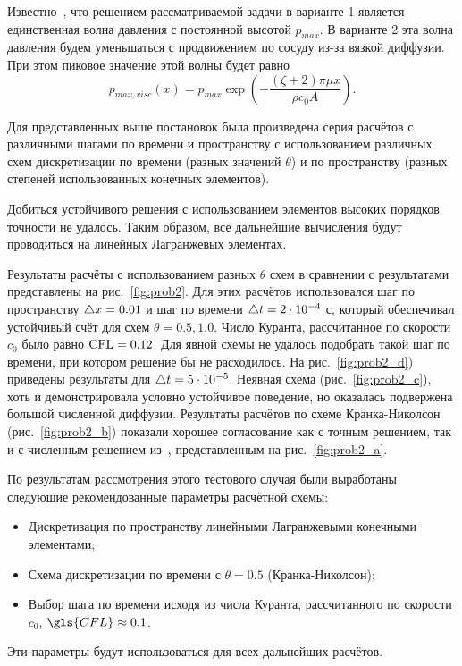 Известно~\cite{boileau:2015}, что решением рассматриваемой задачи
в варианте 1 является единственная волна давления с постоянной высотой $p_{max}$.
В варианте 2 эта волна давления будем уменьшаться с продвижением по сосуду из-за вязкой диффузии. При
этом пиковое значение этой волны будет равно
\begin{equation}
\label{eq:p_peak_visc}
p_{max, visc}(x) = p_{max} \exp\left(-\frac{(\zeta + 2)\pi \mu x}{\rho c_0 A}\right).
\end{equation}

Для представленных выше постановок
была произведена серия расчётов с различными шагами по времени и пространству
с использованием различных схем дискретизации по времени (разных значений $\theta$)
и по пространству (разных степеней использованных конечных элементов).

Добиться устойчивого решения с использованием элементов высоких порядков точности
не удалось. Таким образом, все дальнейшие вычисления
будут проводиться на линейных Лагранжевых элементах.

Результаты расчёты с использованием разных $\theta$ 
схем в сравнении с результатами~\cite{boileau:2015}
представлены на рис.~\ref{fig:prob2}.
Для этих расчётов использовался шаг по пространству $\triangle x = 0.01$
и шаг по времени $\triangle t = 2\cdot10^{-4}$ с,
который обеспечивал устойчивый счёт для схем $\theta=0.5, 1.0$.
Число Куранта, рассчитанное по скорости $c_0$ было равно $\mathrm{CFL} = 0.12$.
Для явной схемы
не удалось подобрать такой шаг по времени, при котором решение
бы не расходилось.  На рис.~\ref{fig:prob2_d}) приведены результаты для $\triangle t=5\cdot10^{-5}$.
Неявная схема (рис.~\ref{fig:prob2_c}), хоть и демонстрировала условно устойчивое поведение,
но оказалась подвержена большой численной диффузии.
Результаты расчётов по схеме Кранка-Николсон (рис.~\ref{fig:prob2_b})
показали хорошее согласование как с точным решением, так и с численным решением из~\cite{boileau:2015},
представленным на рис.~\ref{fig:prob2_a}.

По результатам рассмотрения этого тестового случая были выработаны следующие
рекомендованные параметры расчётной схемы:
\begin{itemize}
\item Дискретизация по пространству линейными Лагранжевыми конечными элементами;
\item Схема дискретизации по времени с $\theta=0.5$ (Кранка-Николсон);
\item Выбор шага по времени исходя из числа Куранта, рассчитанного по скорости $c_0$, $\gls{CFL} \approx 0.1$.
\end{itemize}
Эти параметры будут использоваться для всех дальнейших расчётов.

